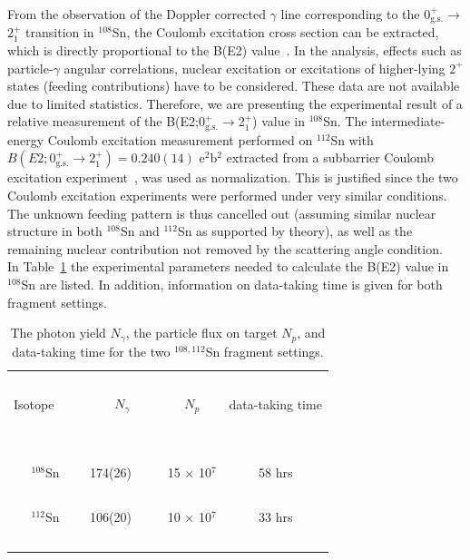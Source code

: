 \documentclass[prc,twocolumn,amssymb,amsmath,showpacs,superscriptaddress]{revtex4}
\begin{document}
From the observation of the Doppler corrected $\gamma$ line
corresponding to the $0^{+}_{\text{g.s.}}$$\to$$2^{+}_{1}$
transition in $^{108}$Sn, the Coulomb excitation cross section can
be extracted, which is directly proportional to the B(E2)
value~\cite{win79}. In the analysis, effects such as
particle-$\gamma$ angular correlations, nuclear excitation or
excitations of higher-lying $2^{+}$ states (feeding contributions)
have to be considered. These data are not available due to limited
statistics. Therefore, we are presenting the experimental result
of a relative measurement of the
B(E2;0$^+_{\text{g.s.}}$$\to$2$^+_1$) value in $^{108}$Sn. The
intermediate-energy Coulomb excitation measurement performed on
$^{112}$Sn with $B(E2;0^{+}_{\text{g.s.}}\to 2^{+}_{1}) =
0.240(14)$ e$^{2}$b$^{2}$ extracted from a subbarrier Coulomb
excitation experiment~\cite{ram01}, was used as normalization.
This is justified since the two Coulomb excitation experiments
were performed under very similar conditions. The unknown feeding
pattern is thus cancelled out (assuming similar nuclear structure
in both $^{108}$Sn and $^{112}$Sn as supported by theory), as well
as the remaining nuclear
contribution not removed by the scattering angle condition.\\
In Table~\ref{tab-1} the experimental parameters needed to
calculate the B(E2) value in $^{108}$Sn are listed. In addition,
information on data-taking
time is given for both fragment settings.
\begin{table}[htb]
\caption{The photon yield $N_{\gamma}$, the particle flux on
target $N_{p}$, and data-taking time for the two $^{108,112}$Sn
fragment settings.} \label{tab-1}
\begin{tabular}[t]{cccc}
\hline \hline
           &               &              &  ~~~ \\
Isotope ~~~& $N_{\gamma}$\footnotemark[1]& $N_{p}$\footnotemark[2] &  data-taking time \\
           &               &              &  ~~~ \\
\hline \hline
           &               &              &  ~~~ \\
$^{108}$Sn & 174(26) ~~~  & 15 $\times$ 10$^{7}$&  58 hrs \\
           &               &              &  ~~~ \\
$^{112}$Sn & 106(20) ~~~  & 10 $\times$ 10$^{7}$&  33 hrs \\
           &               &              &  ~~~ \\
\hline \hline
\end{tabular}
 
\end{table}
\end{document}
